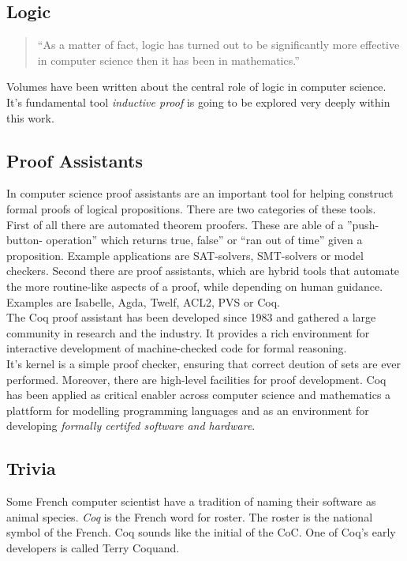 \subsection{Logic}

\begin{quote}
``As a matter of fact, logic has turned out to be significantly more effective in computer science then it has been in mathematics.''
\end{quote}
Volumes have been written about the central role of logic in computer science. 
It's fundamental tool {\itshape inductive proof} is going to be explored very deeply within this work.


\subsection{Proof Assistants}

In computer science proof assistants are an important tool for helping construct formal proofs of logical propositions.
There are two categories of these tools.\\
First of all there are automated theorem proofers. 
These are able of a ''push-button- operation'' which returns true, false'' or ``ran out of time'' given a proposition.
Example applications are \glspl{SAT-solver}, \glspl{SMT-solver} or \glspl{model checker}. 
Second there are proof assistants, which are hybrid tools that automate the more routine-like aspects of a proof, while depending on human guidance. 
Examples are \gls{Isabelle}, Agda, Twelf, ACL2, PVS or Coq.\\
The Coq proof assistant has been developed since 1983 and gathered a large community in research and the industry.
It provides a rich environment for interactive development of machine-checked code for formal reasoning.\\
It's kernel is a simple proof checker, ensuring that correct deution of sets are ever performed. 
Moreover, there are high-level facilities for proof development.
Coq has been applied as critical enabler across computer science and mathematics a plattform for modelling programming languages and as an environment for developing {\itshape formally certifed software and hardware}.
 

\subsection{Trivia}

Some French computer scientist have a tradition of naming their software as animal species.
{\itshape Coq} is the French word for roster.
The roster is the national symbol of the French.
Coq sounds like the initial of the \gls{CoC}.
One of Coq's early developers is called Terry Coquand.


